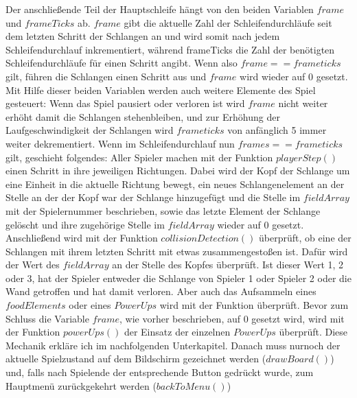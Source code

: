 Der anschließende Teil der Hauptschleife hängt von den beiden Variablen $frame$ und $frameTicks$ ab. $frame$ gibt die aktuelle Zahl der Schleifendurchläufe seit dem letzten Schritt der Schlangen an und wird somit nach jedem Schleifendurchlauf inkrementiert, während frameTicks die Zahl der benötigten Schleifendurchläufe für einen Schritt angibt. Wenn also $frame == frameticks$ gilt, führen die Schlangen einen Schritt aus und $frame$ wird wieder auf 0 gesetzt. Mit Hilfe dieser beiden Variablen werden auch weitere Elemente des Spiel gesteuert: Wenn das Spiel pausiert oder verloren ist wird $frame$ nicht weiter erhöht damit die Schlangen stehenbleiben, und zur Erhöhung der Laufgeschwindigkeit der Schlangen wird $frameticks$ von anfänglich 5 immer weiter dekrementiert. Wenn im Schleifendurchlauf nun $frames == frameticks$ gilt, geschieht folgendes: Aller Spieler machen mit der Funktion $playerStep()$ einen Schritt in ihre jeweiligen Richtungen. Dabei wird der Kopf der Schlange um eine Einheit in die aktuelle Richtung bewegt, ein neues Schlangenelement an der Stelle an der der Kopf war der Schlange hinzugefügt und die Stelle im $fieldArray$ mit der Spielernummer beschrieben, sowie das letzte Element der Schlange gelöscht und ihre zugehörige Stelle im $fieldArray$ wieder auf 0 gesetzt. Anschließend wird mit der Funktion $collisionDetection()$ überprüft, ob eine der Schlangen mit ihrem letzten Schritt mit etwas zusammengestoßen ist. Dafür wird der Wert des $fieldArray$ an der Stelle des Kopfes überprüft. Ist dieser Wert 1, 2 oder 3, hat der Spieler entweder die Schlange von Spieler 1 oder Spieler 2 oder die Wand getroffen und hat damit verloren. Aber auch das Aufsammeln eines $foodElements$ oder eines $PowerUps$ wird mit der Funktion überprüft. Bevor zum Schluss die Variable $frame$, wie vorher beschrieben, auf 0 gesetzt wird, wird mit der Funktion $powerUps()$ der Einsatz der einzelnen $PowerUps$ überprüft. Diese Mechanik erkläre ich im nachfolgenden Unterkapitel.
Danach muss nurnoch der aktuelle Spielzustand auf dem Bildschirm gezeichnet werden ($drawBoard()$) und, falls nach Spielende der entsprechende Button gedrückt wurde, zum Hauptmenü zurückgekehrt werden ($backToMenu()$)




%


   

%
